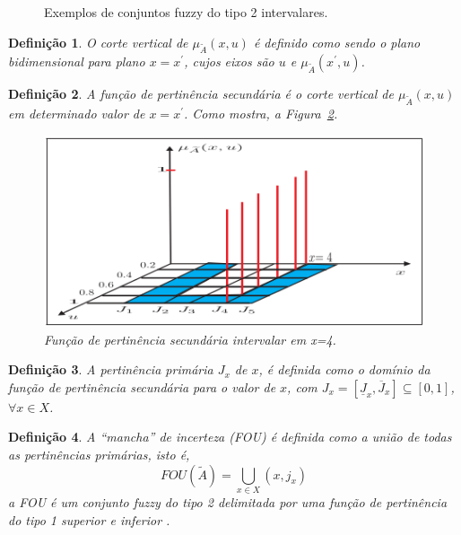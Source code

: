 \documentclass[tcc,capa]{texufpel}
\newtheorem{Def}{Defini\c c\~ao}
\begin{document}
\begin{figure}[h]
\caption{Exemplos de conjuntos fuzzy do tipo 2 intervalares.}\label{fig:conj}
\end{figure}

\begin{Def}
O corte vertical de $\mu_{\tilde{A}}(x,u)$ é definido como sendo o plano bidimensional para plano $x = x^{'}$, cujos eixos são $u$ e $\mu_{\tilde{A}}(x^{'},u)$. 
\end{Def}


\begin{Def}
A função de pertinência secundária é o corte vertical de $\mu_{\tilde{A}}(x,u)$ em determinado valor de $x = x^{'}$. Como mostra, a Figura~\ref{fig:fp_secundaria_sf_t2}.

\begin{figure}[!h]
\centering
\includegraphics[scale=0.55]{images/fp_secundaria_sf_t2.png}
\caption{Função de pertinência secundária intervalar em x=4.} %
\label{fig:fp_secundaria_sf_t2}
\end{figure} 

\end{Def}

\begin{Def}
A pertinência primária $J_{x}$ de $x$, é definida como o domínio da função de pertinência secundária para o valor de $x$, com $J_{x}=[\underline{J}_{x},\overline{J}_{x}]\subseteq [0,1]$, $\forall x \in  X$.
\end{Def}

\begin{Def}
A ``mancha'' de incerteza (FOU) é definida como a união de todas as pertinências primárias, isto é,
\begin{equation}
FOU(\tilde{A})= \bigcup_{x \in X} (x, j_{x})
\end{equation}
a FOU é um conjunto fuzzy do tipo 2 delimitada por uma função de pertinência do tipo 1 superior e inferior \citep{rizol2011logica}.
\end{Def}
\end{document}
